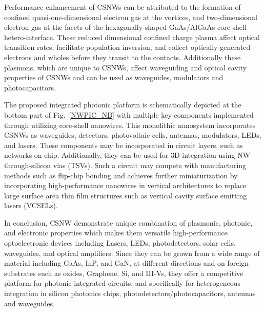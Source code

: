 Performance
enhancement of CSNWs can be attributed to the
formation of confined quasi-one-dimensional electron gas at the
vortices, and two-dimensional electron gas at the facets of the
hexagonally shaped GaAs/AlGaAs core-shell hetero-interface.
These reduced dimensional confined charge plasma affect optical
transition rates, facilitate population inversion, and collect optically
generated electrons and wholes before they transit to the contacts.
Additionally these plasmons, which are unique to CSNWs, affect
waveguiding and optical cavity properties of CSNWs and can be used as
waveguides, modulators and photocapacitors.

The proposed integrated photonic platform is schematically depicted at
the bottom part of Fig.~\ref{NWPIC_NB} with multiple key components implemented
through utilizing core-shell nanowires. This monolithic nanosystem
incorporates CSNWs as waveguides, detectors, photovoltaic cells,
antennas, modulators, LEDs, and lasers. These components may be
incorporated in circuit layers, such as networks on chip. Additionally,
they can be used for 3D integration using NW through-silicon vias
(TSVs). Such a circuit may compete with manufacturing methods such as
flip-chip bonding and achieves further miniaturization by incorporating
high-performance nanowires in vertical architectures to replace large
surface area thin film structures such as vertical cavity surface
emitting lasers (VCSELs).

In conclusion, CSNW demonstrate unique combination of plasmonic, photonic,
and electronic properties which makes them versatile high-performance
optoelectronic devices including Lasers, LEDs, photodetectors, solar
cells, waveguides, and optical amplifiers. Since they can be grown from
a wide range of material including GaAs, InP, and GaN, at different
directions and on foreign substrates such as oxides, Graphene, Si, and
III-Vs, they offer a competitive platform for photonic integrated
circuits, and specifically for heterogeneous integration in silicon
photonics chips, photodetectors/photocapacitors, antennas and
waveguides.

